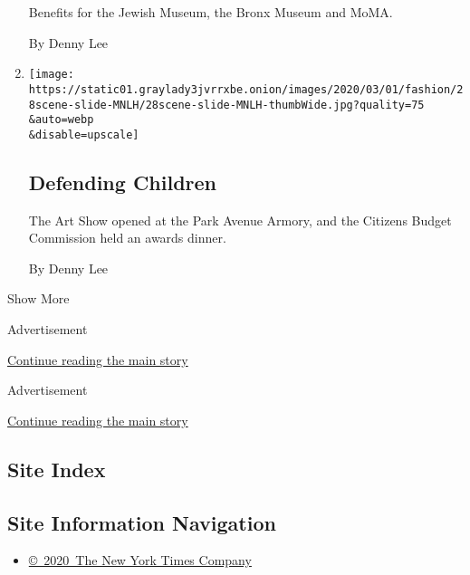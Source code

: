 \begin{enumerate}
  Benefits for the Jewish Museum, the Bronx Museum and MoMA.

  By Denny Lee
\item
  \href{/2020/02/28/style/defending-children.html}{}

  \texttt{[image: https://static01.graylady3jvrrxbe.onion/images/2020/03/01/fashion/28scene-slide-MNLH/28scene-slide-MNLH-thumbWide.jpg?quality=75\\\&auto=webp\\\&disable=upscale]}

  \hypertarget{defending-children}{%
  \subsection{Defending Children}\label{defending-children}}

  The Art Show opened at the Park Avenue Armory, and the Citizens Budget
  Commission held an awards dinner.

  By Denny Lee
\end{enumerate}

Show More

Advertisement

\protect\hyperlink{after-mid1}{Continue reading the main story}

Advertisement

\protect\hyperlink{after-mktg}{Continue reading the main story}

\hypertarget{site-index}{%
\subsection{Site Index}\label{site-index}}

\hypertarget{site-information-navigation}{%
\subsection{Site Information
Navigation}\label{site-information-navigation}}

\begin{itemize}
\tightlist
\item
  \href{https://help.nytimes3xbfgragh.onion/hc/en-us/articles/115014792127-Copyright-notice}{©~2020~The
  New York Times Company}
\end{itemize}

